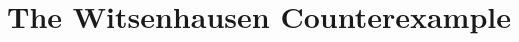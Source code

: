 \documentclass[conference,compsoc]{IEEEtran}
\begin{document}
%




\section{The Witsenhausen Counterexample}
\end{document}
